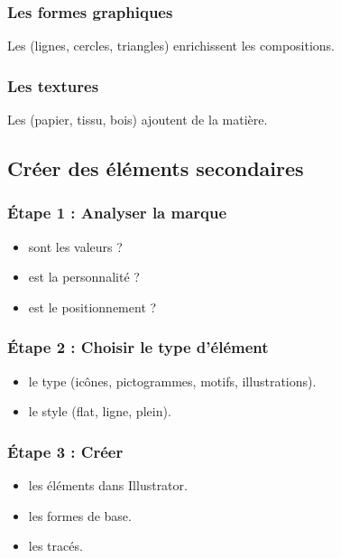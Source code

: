 \subsubsection{Les formes graphiques}

Les  (lignes, cercles, triangles) enrichissent les compositions.

\subsubsection{Les textures}

Les  (papier, tissu, bois) ajoutent de la matière.

\subsection{Créer des éléments secondaires}

\subsubsection{Étape 1 : Analyser la marque}

\begin{itemize}
    \item {} sont les valeurs ?
    \item {} est la personnalité ?
    \item {} est le positionnement ?
\end{itemize}

\subsubsection{Étape 2 : Choisir le type d'élément}

\begin{itemize}
    \item {} le type (icônes, pictogrammes, motifs, illustrations).
    \item {} le style (flat, ligne, plein).
\end{itemize}

\subsubsection{Étape 3 : Créer}

\begin{itemize}
    \item {} les éléments dans Illustrator.
    \item {} les formes de base.
    \item {} les tracés.
\end{itemize}

